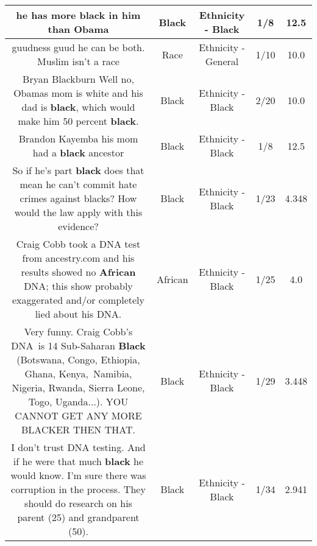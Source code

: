 \documentclass[11pt]{article}
\newlength\mylength
\begin{document}
\begin{center}
\begin{longtable}{|C{.65\mylength}|C{.30\mylength}|C{.12\mylength}|C{.12\mylength}|C{.12\mylength}|}
  \small he has more \textbf{black} in him than Obama\normalsize   & Black & Ethnicity - Black & 1/8 & 12.5 \\  \hline
  \small guudness guud he can be both. Muslim isn't a race\normalsize   & Race & Ethnicity - General & 1/10 & 10.0 \\  \hline
  \small Bryan Blackburn Well no, Obamas mom is white and his dad is \textbf{black}, which would make him 50 percent \textbf{black}.\normalsize   & Black & Ethnicity - Black & 2/20 & 10.0 \\  \hline
  \small Brandon Kayemba his mom had a \textbf{black} ancestor\normalsize   & Black & Ethnicity - Black & 1/8 & 12.5 \\  \hline
  \small So if he's part \textbf{black} does that mean he can't commit hate crimes against blacks? How would the law apply with this evidence?\normalsize   & Black & Ethnicity - Black & 1/23 & 4.348 \\  \hline
  \small Craig Cobb took a DNA test from ancestry.com and his results showed no \textbf{African} DNA; this show probably exaggerated and/or completely lied about his DNA.\normalsize   & African & Ethnicity - Black & 1/25 & 4.0 \\  \hline
  \small Very funny. Craig Cobb's DNA is 14 Sub-Saharan \textbf{Black} (Botswana, Congo, Ethiopia, Ghana, Kenya, Namibia, Nigeria, Rwanda, Sierra Leone, Togo, Uganda...). YOU CANNOT GET ANY MORE BLACKER THEN THAT.\normalsize   & Black & Ethnicity - Black & 1/29 & 3.448 \\  \hline
  \small I don't trust DNA testing. And if he were that much \textbf{black} he would know. I'm sure there was corruption in the process. They should do research on his parent (25) and grandparent (50).\normalsize   & Black & Ethnicity - Black & 1/34 & 2.941 \\  \hline

\end{longtable}
\end{center}
\end{document}

